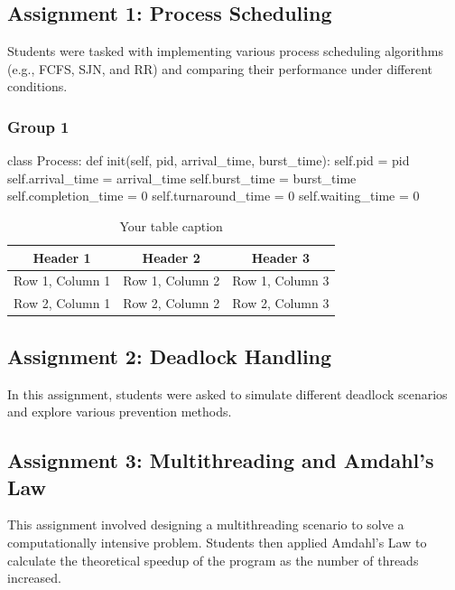 \documentclass[12pt]{article}
\begin{document}
\subsection{Assignment 1: Process Scheduling}
Students were tasked with implementing various process scheduling algorithms (e.g., FCFS, SJN, and RR) and comparing their performance under different conditions.
\subsubsection{Group 1}
\begin{python}
    class Process:
    def init(self, pid, arrival_time, burst_time):
        self.pid = pid
        self.arrival_time = arrival_time
        self.burst_time = burst_time
        self.completion_time = 0
        self.turnaround_time = 0
        self.waiting_time = 0
\end{python}

\begin{table}[htbp] %
    \centering
    \begin{tabular}{|c|c|c|} %
    \hline
    Header 1 & Header 2 & Header 3 \\ %
    \hline
    Row 1, Column 1 & Row 1, Column 2 & Row 1, Column 3 \\ %
    \hline
    Row 2, Column 1 & Row 2, Column 2 & Row 2, Column 3 \\ %
    \hline
    \end{tabular}
    \caption{Your table caption} %
    \label{tab:your_label} %
\end{table}

\subsection{Assignment 2: Deadlock Handling}
In this assignment, students were asked to simulate different deadlock scenarios and explore various prevention methods.

\subsection{Assignment 3: Multithreading and Amdahl's Law}
This assignment involved designing a multithreading scenario to solve a computationally intensive problem. Students then applied Amdahl's Law to calculate the theoretical speedup of the program as the number of threads increased.
\end{document}
